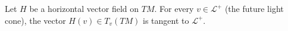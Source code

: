 Let $H$ be a horizontal vector field on $TM$. For every $v \in \mathcal{L}^+$ (the future light cone), the vector $H(v) \in T_v(TM)$ is tangent to $\mathcal{L}^+$.
